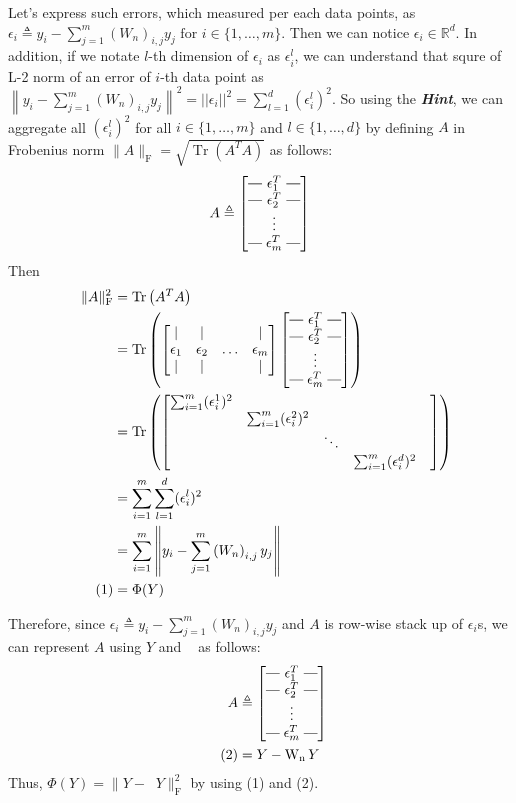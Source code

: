 \documentclass[10pt]{article}
\makeatletter
\DeclareMathOperator{\Wn}{W_n}
\newcommand{\brows}[1]{%
  \begin{bmatrix}
  \begin{array}{@{\protect\rotvert\;}c@{\;\protect\rotvert}}
  #1
  \end{array}
  \end{bmatrix}
}
\newcommand{\rotvert}{\rotatebox[origin=c]{90}{$\vert$}}
\newcommand{\rowsvdots}{\multicolumn{1}{@{}c@{}}{\vdots}}
\makeatother
\begin{document}
\noindent Let's express such errors, which measured per each data points, as $\epsilon_i \triangleq y_{i} - \sum_{j=1}^{m}\left(W_{n}\right)_{i, j} y_{j} \text{ for } i \in \{1, \hdots, m\}$.
Then we can notice $\epsilon_i \in \mathbb{R}^d$. In addition, if we notate $l$-th dimension of $\epsilon_i$ as $\epsilon_i^l$, we can understand that squre of L-2 norm of an error of $i$-th data point as $\left\|y_{i}-\sum_{j=1}^{m}\left(W_{n}\right)_{i, j} y_{j}\right\|^{2}=||\epsilon_i||^2 = \sum_{l=1}^d (\epsilon_i^l)^2$.
So using the \textit{\textbf{Hint}}, we can aggregate all $(\epsilon_i^l)^2$ for all $i \in \{1, \hdots, m\}$ and $l \in \{1, \hdots, d\}$ by defining $A$ in Frobenius norm $\|A\|_{\mathrm{F}}=\sqrt{\operatorname{Tr}\left(A^{T} A\right)}$ as follows:
$$
A \triangleq \brows{\epsilon_1^T \\ \epsilon_2^T \\ \rowsvdots \\ \epsilon_m^T}
$$
Then
\begin{align*}
  \|A\|_{\mathrm{F}}^{2}&=\operatorname{Tr}\left(A^{T} A\right)\\
  &=\operatorname{Tr}\left(\begin{bmatrix}
    \vert &  \vert & &\vert \\
    \epsilon_1 & \epsilon_2 & \hdots &\epsilon_m \\
    \vert & \vert& & \vert
\end{bmatrix}
\brows{\epsilon_1^T \\ \epsilon_2^T \\ \rowsvdots \\ \epsilon_m^T}\right)\\
  &=\operatorname{Tr}\left(
  \begin{bmatrix}
    \sum_{i=1}^m(\epsilon_i^1)^2 &&& \\
    &\sum_{i=1}^m(\epsilon_i^2)^2 &&&\\
    &&\ddots && \\
    &&&    \sum_{i=1}^m(\epsilon_i^d)^2& \\
  \end{bmatrix}\right)\\
  &=\sum_{i=1}^m\sum_{l=1}^d(\epsilon_i^l)^2\\
  &=\sum_{i=1}^m\left\|y_{i}-\sum_{j=1}^{m}\left(W_{n}\right)_{i, j} y_{j}\right\|\\
  \tag{1}&=\Phi(Y)
\end{align*}

\noindent Therefore, since $\epsilon_i \triangleq y_{i} - \sum_{j=1}^{m}\left(W_{n}\right)_{i, j} y_{j}$ and $A$ is row-wise stack up of $\epsilon_i$s, we can represent $A$ using $Y$ and $\Wn$ as follows:
\begin{align*}
A &\triangleq \brows{\epsilon_1^T \\ \epsilon_2^T \\ \rowsvdots \\ \epsilon_m^T} \\
  \tag{2}&=Y-\Wn Y
\end{align*}
Thus, $\Phi(Y) =\|Y- \Wn Y\|_{\mathrm{F}}^{2}$ by using (1) and (2).
\end{document}

